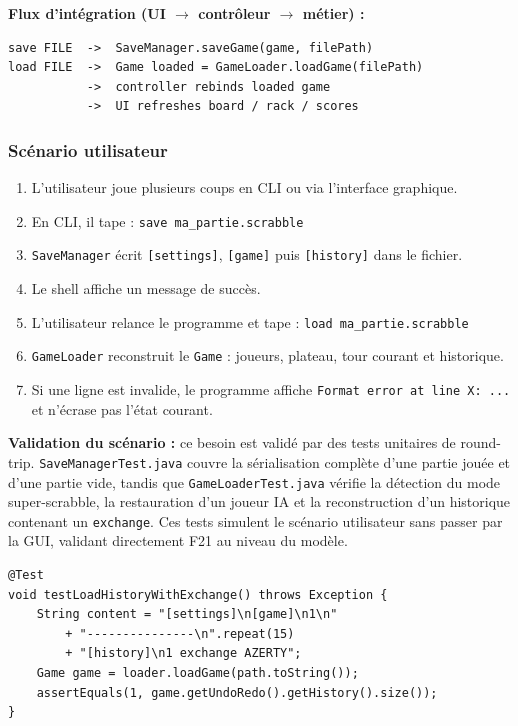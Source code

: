 \documentclass[a4paper]{article}
\begin{document}
\textbf{Flux d'intégration (UI $\rightarrow$ contrôleur $\rightarrow$ métier) :}
\begin{verbatim}
save FILE  ->  SaveManager.saveGame(game, filePath)
load FILE  ->  Game loaded = GameLoader.loadGame(filePath)
           ->  controller rebinds loaded game
           ->  UI refreshes board / rack / scores
\end{verbatim}

\subsubsection{Scénario utilisateur}

\begin{enumerate}
    \item L'utilisateur joue plusieurs coups en CLI ou via l'interface graphique.
    \item En CLI, il tape : \texttt{save ma\_partie.scrabble}
    \item \texttt{SaveManager} écrit \texttt{[settings]}, \texttt{[game]} puis \texttt{[history]} dans le fichier.
    \item Le shell affiche un message de succès.
    \item L'utilisateur relance le programme et tape : \texttt{load ma\_partie.scrabble}
    \item \texttt{GameLoader} reconstruit le \texttt{Game} : joueurs, plateau, tour courant et historique.
    \item Si une ligne est invalide, le programme affiche \texttt{Format error at line X: ...} et n'écrase pas l'état courant.
\end{enumerate}

\begin{tcolorbox}[colback=blue!5!white, colframe=blue!75!black, title=Stratégie de validation]
\textbf{Validation du scénario :} ce besoin est validé par des tests unitaires de round-trip. \texttt{SaveManagerTest.java} couvre la sérialisation complète d'une partie jouée et d'une partie vide, tandis que \texttt{GameLoaderTest.java} vérifie la détection du mode super-scrabble, la restauration d'un joueur IA et la reconstruction d'un historique contenant un \texttt{exchange}. Ces tests simulent le scénario utilisateur sans passer par la GUI, validant directement F21 au niveau du modèle.

\begin{verbatim}
@Test
void testLoadHistoryWithExchange() throws Exception {
    String content = "[settings]\n[game]\n1\n"
        + "---------------\n".repeat(15)
        + "[history]\n1 exchange AZERTY";
    Game game = loader.loadGame(path.toString());
    assertEquals(1, game.getUndoRedo().getHistory().size());
}
\end{verbatim}
\end{tcolorbox}
\end{document}
